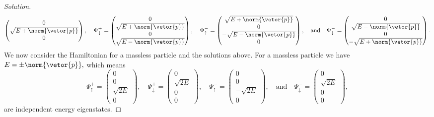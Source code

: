 \begin{proof}[Solution]
\begin{equation*}
\begin{pmatrix}
         0\\
         \sqrt{E + \norm{\vetor{p}}}\\
         0
      \end{pmatrix},\quad
      \Psi^+_\downarrow = \begin{pmatrix}
         0\\
         \sqrt{E + \norm{\vetor{p}}}\\
         0\\
         \sqrt{E - \norm{\vetor{p}}}
      \end{pmatrix},\quad
      \Psi^-_\uparrow = \begin{pmatrix}
         \sqrt{E + \norm{\vetor{p}}}\\
         0\\
         -\sqrt{E - \norm{\vetor{p}}}\\
         0
      \end{pmatrix},\quad\text{and}\quad
      \Psi^-_\downarrow = \begin{pmatrix}
         0\\
         \sqrt{E - \norm{\vetor{p}}}\\
         0\\
         -\sqrt{E + \norm{\vetor{p}}}
      \end{pmatrix}.
   \end{equation*}
   We now consider the Hamiltonian for a massless particle and the solutions above. For a massless particle we have \(E = \pm \norm{\vetor{p}},\) which means
   \begin{equation*}
      \Psi^+_\uparrow = \begin{pmatrix}
         0\\
         0\\
         \sqrt{2E}\\
         0
      \end{pmatrix},\quad
      \Psi^+_\downarrow = \begin{pmatrix}
         0\\
         \sqrt{2E}\\
         0\\
         0
      \end{pmatrix},\quad
      \Psi^-_\uparrow = \begin{pmatrix}
         0\\
         0\\
         -\sqrt{2E}\\
         0
      \end{pmatrix},\quad\text{and}\quad
      \Psi^-_\downarrow = \begin{pmatrix}
         0\\
         \sqrt{2E}\\
         0\\
         0
      \end{pmatrix},
   \end{equation*}
   are independent energy eigenstates.
\end{proof}

